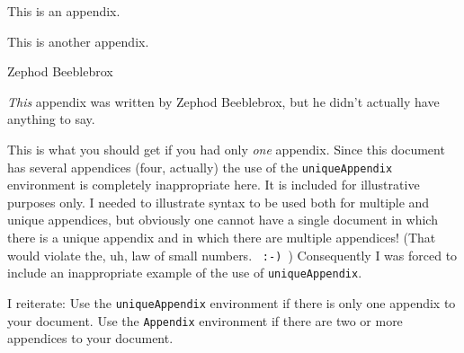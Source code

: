 \documentclass[times, doublespace]{anzsauth}
\begin{document}
\begin{Appendix}
\label{app:mung}

This is an appendix. \lipsum[1]

\end{Appendix}

\begin{Appendix}
\label{app:gorp}

This is another appendix. \lipsum[2]

\end{Appendix}

\begin{Appendix}
\label{app:zephod}
\begin{center}
Zephod Beeblebrox
\end{center}

\emph{This} appendix was written by Zephod Beeblebrox, but he didn't
actually have anything to say. \lipsum[3]
\end{Appendix}

\begin{uniqueAppendix}
This is what you should get if you had only \emph{one} appendix.
Since this document has several appendices (four, actually) the
use of the \texttt{uniqueAppendix} environment is completely
inappropriate here.  It is included for illustrative purposes
only.  I needed to illustrate syntax to be used both for multiple
and unique appendices, but obviously one cannot have a single
document in which there is a unique appendix and in which there are
multiple appendices!  (That would violate the, uh, law of small
numbers. \verb! :-) !)  Consequently I was forced to include an
inappropriate example of the use of \texttt{uniqueAppendix}.

I reiterate:  Use the \texttt{uniqueAppendix} environment if there is
only one appendix to your document.  Use the \texttt{Appendix}
environment if there are two or more appendices to your document.
\end{uniqueAppendix}


\newpage


\end{document}
